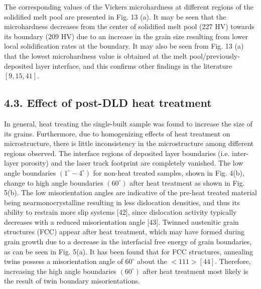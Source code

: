 \documentclass[10pt]{article}
\begin{document}
The corresponding values of the Vickers microhardness at different regions of the solidified melt pool are presented in Fig. 13 (a). It may be seen that the microhardness decreases from the center of solidified melt pool (227 HV) towards its boundary (209 HV) due to an increase in the grain size resulting from lower local solidification rates at the boundary. It may also be seen from Fig. 13 (a) that the lowest microhardness value is obtained at the melt pool/previously-deposited layer interface, and this confirms other findings in the literature $[9,15,41]$.

\subsection*{4.3. Effect of post-DLD heat treatment}
In general, heat treating the single-built sample was found to increase the size of its grains. Furthermore, due to homogenizing effects of heat treatment on microstructure, there is little inconsistency in the microstructure among different regions observed. The interface regions of deposited layer boundaries (i.e. inter-layer porosity) and the laser track footprint are completely vanished. The low angle boundaries $\left(1^{\circ}-4^{\circ}\right)$ for non-heat treated samples, shown in Fig. 4(b), change to high angle boundaries $\left(60^{\circ}\right)$ after heat treatment as shown in Fig. 5(b). The low misorientation angles are indicative of the pre-heat treated material being nearmonocrystalline resulting in less dislocation densities, and thus its ability to restrain more slip systems [42], since dislocation activity typically decreases with a reduced misorientation angle [43]. Twinned austenitic grain structures (FCC) appear after heat treatment, which may have formed during grain growth due to a decrease in the interfacial free energy of grain boundaries, as can be seen in Fig. 5(a). It has been found that for FCC structures, annealing twins possess a misorientation angle of $60^{\circ}$ about the $<111>[44]$. Therefore, increasing the high angle boundaries $\left(60^{\circ}\right)$ after heat treatment most likely is the result of twin boundary misorientations.
\end{document}

